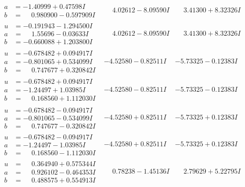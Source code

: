 \documentclass[1p]{elsarticle_modified}
\theoremstyle{definition}
\begin{document}
$$\begin{array}{c|c|c}
\begin{aligned}
a &= -1.40999 + 0.47598 I \\
b &= \phantom{-}0.980900 - 0.597909 I\end{aligned}
 & \phantom{-}4.02612 - 8.09590 I & \phantom{-}3.41300 + 8.32326 I \\ \hline\begin{aligned}
u &= -0.191943 - 1.294500 I \\
a &= \phantom{-}1.55696 - 0.03633 I \\
b &= -0.660088 + 1.203800 I\end{aligned}
 & \phantom{-}4.02612 - 8.09590 I & \phantom{-}3.41300 + 8.32326 I \\ \hline\begin{aligned}
u &= -0.678482 + 0.094917 I \\
a &= -0.801065 + 0.534099 I \\
b &= \phantom{-}0.747677 + 0.320842 I\end{aligned}
 & -4.52580 - 0.82511 I & -5.73325 - 0.12383 I \\ \hline\begin{aligned}
u &= -0.678482 + 0.094917 I \\
a &= -1.24497 + 1.03985 I \\
b &= \phantom{-}0.168560 + 1.112030 I\end{aligned}
 & -4.52580 - 0.82511 I & -5.73325 - 0.12383 I \\ \hline\begin{aligned}
u &= -0.678482 - 0.094917 I \\
a &= -0.801065 - 0.534099 I \\
b &= \phantom{-}0.747677 - 0.320842 I\end{aligned}
 & -4.52580 + 0.82511 I & -5.73325 + 0.12383 I \\ \hline\begin{aligned}
u &= -0.678482 - 0.094917 I \\
a &= -1.24497 - 1.03985 I \\
b &= \phantom{-}0.168560 - 1.112030 I\end{aligned}
 & -4.52580 + 0.82511 I & -5.73325 + 0.12383 I \\ \hline\begin{aligned}
u &= \phantom{-}0.364940 + 0.575344 I \\
a &= \phantom{-}0.926102 - 0.464353 I \\
b &= \phantom{-}0.488575 + 0.554913 I\end{aligned}
 & \phantom{-}0.78238 - 1.45136 I & \phantom{-}2.79629 + 5.22795 I \\ \hline\begin{aligned}

\end{aligned}
\end{array}$$
\end{document}
